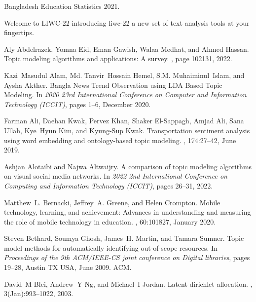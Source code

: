 \begin{thebibliography}{10}

Bangladesh {Education} {Statistics} 2021.

Welcome to {LIWC}-22 introducing liwc-22 a new set of text analysis tools at
  your fingertips.

Aly Abdelrazek, Yomna Eid, Eman Gawish, Walaa Medhat, and Ahmed Hassan.
\newblock Topic modeling algorithms and applications: A survey.
, page 102131, 2022.

Kazi~Masudul Alam, Md. Tanvir~Hossain Hemel, S.M. Muhaiminul~Islam, and Aysha
  Akther.
\newblock Bangla {News} {Trend} {Observation} using {LDA} {Based} {Topic}
  {Modeling}.
\newblock In {\em 2020 23rd {International} {Conference} on {Computer} and
  {Information} {Technology} ({ICCIT})}, pages 1--6, December 2020.

Farman Ali, Daehan Kwak, Pervez Khan, Shaker El-Sappagh, Amjad Ali, Sana Ullah,
  Kye~Hyun Kim, and Kyung-Sup Kwak.
\newblock Transportation sentiment analysis using word embedding and
  ontology-based topic modeling.
, 174:27--42, June 2019.

Ashjan Alotaibi and Najwa Altwaijry.
\newblock A comparison of topic modeling algorithms on visual social media
  networks.
\newblock In {\em 2022 2nd International Conference on Computing and
  Information Technology (ICCIT)}, pages 26--31, 2022.

Matthew~L. Bernacki, Jeffrey~A. Greene, and Helen Crompton.
\newblock Mobile technology, learning, and achievement: {Advances} in
  understanding and measuring the role of mobile technology in education.
, 60:101827, January 2020.

Steven Bethard, Soumya Ghosh, James~H. Martin, and Tamara Sumner.
\newblock Topic model methods for automatically identifying out-of-scope
  resources.
\newblock In {\em Proceedings of the 9th {ACM}/{IEEE}-{CS} joint conference on
  {Digital} libraries}, pages 19--28, Austin TX USA, June 2009. ACM.

David~M Blei, Andrew~Y Ng, and Michael~I Jordan.
\newblock Latent dirichlet allocation.
, 3(Jan):993--1022, 2003.


\end{thebibliography}
